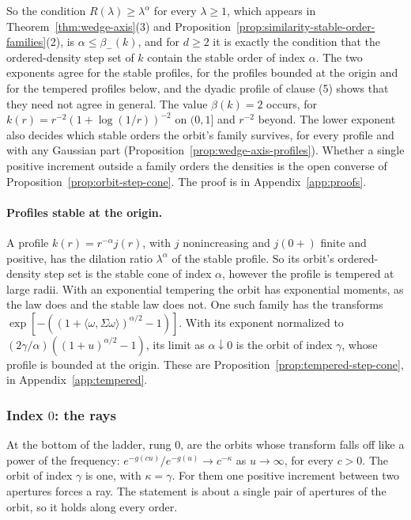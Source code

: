 So the condition $R(\lambda) \ge \lambda^\alpha$ for every $\lambda \ge 1$, which appears in
Theorem~\ref{thm:wedge-axis}(3) and Proposition~\ref{prop:similarity-stable-order-families}(2), is
$\alpha \le \beta_-(k)$, and for $d \ge 2$ it is exactly the condition that the ordered-density step set of
$k$ contain the stable order of index $\alpha$. The two exponents agree for the stable profiles, for
the profiles bounded at the origin and for the tempered profiles below, and the
dyadic profile of clause (5) shows that they need not agree in general. The value $\beta(k) = 2$
occurs, for $k(r) = r^{-2}(1 + \log(1/r))^{-2}$ on $(0, 1]$ and $r^{-2}$ beyond. The lower exponent
also decides which stable orders the orbit's family survives, for every profile and with
any Gaussian part (Proposition~\ref{prop:wedge-axis-profiles}). Whether a single positive increment outside a family orders
the densities is the open converse of Proposition~\ref{prop:orbit-step-cone}. The proof is in
Appendix~\ref{app:proofs}.

\paragraph{Profiles stable at the origin.} A profile $k(r) = r^{-\alpha}j(r)$, with $j$ nonincreasing
and $j(0{+})$ finite and positive, has the dilation ratio $\lambda^\alpha$ of the stable profile. So
its orbit's ordered-density step set is the stable cone of index $\alpha$, however the profile is tempered
at large radii. With an exponential tempering the orbit has exponential moments, as the \Matern{} law
does and the stable law does not. One such family has the transforms
$\exp[-((1 + \langle\omega,\Sigma\omega\rangle)^{\alpha/2} - 1)]$. With its exponent normalized to
$(2\gamma/\alpha)((1 + u)^{\alpha/2} - 1)$, its limit as $\alpha \downarrow 0$ is the \Matern{} orbit of
index $\gamma$, whose profile is bounded at the origin. These are Proposition~\ref{prop:tempered-step-cone},
in Appendix~\ref{app:tempered}.

\subsubsection*{Index $0$: the rays}

At the bottom of the ladder, rung $0$, are the orbits whose transform falls off like a power of the
frequency: $e^{-g(cu)}/e^{-g(u)} \to c^{-\kappa}$ as $u \to \infty$, for every $c > 0$. The \Matern{}
orbit of index $\gamma$ is one, with $\kappa = \gamma$. For them one positive increment between two
apertures forces a ray. The statement is about a single pair of apertures of the orbit, so it holds
along every order.

